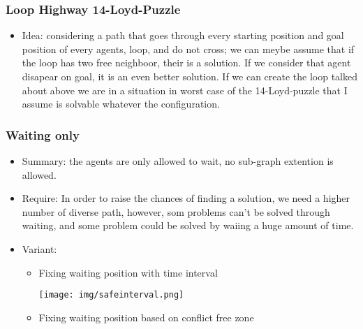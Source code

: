 \documentclass{article}
\theoremstyle{definition}
\begin{document}
\subsubsection{Loop Highway 14-Loyd-Puzzle}
\begin{itemize}
  \item Idea: considering a path that goes through every starting position and goal position of every agents, loop, and do not cross; we can meybe assume that if the loop has two free neighboor, their is a solution. If we consider that agent disapear on goal, it is an even better solution. If we can create the loop talked about above we are in a situation in worst case of the 14-Loyd-puzzle that I assume is solvable whatever the configuration.
\end{itemize}


                             
\subsubsection{Waiting only}
\begin{itemize}
  \item Summary: the agents are only allowed to wait, no sub-graph extention is allowed.
  \item Require: In order to raise the chances of finding a solution, we need a higher number of diverse path, however, som problems can't  be solved through waiting, and some problem could be solved by waiing a huge amount of time. 
  \item Variant:\begin{itemize}
    \item Fixing waiting position with time interval \cite{phli11a,naphli12a}
    
    
    \texttt{[image: img/safeinterval.png]}
    \item Fixing waiting position based on conflict free zone
  \end{itemize}
\end{itemize}

  
\end{document}
